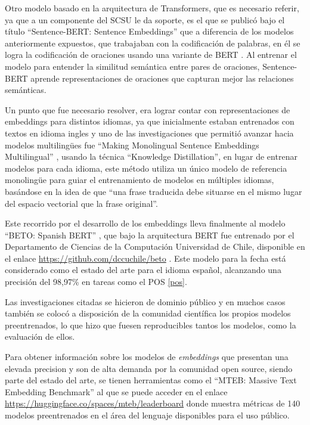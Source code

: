 \documentclass[
  12pt,
  openany]{book}
\begin{document}
Otro modelo basado en la arquitectura de Transformers, que es necesario referir, ya que a un componente del SCSU le da soporte, es el que se publicó bajo el título ``Sentence-BERT: Sentence Embeddings'' \citep{reimers2019a} que a diferencia de los modelos anteriormente expuestos, que trabajaban con la codificación de palabras, en él se logra la codificación de oraciones usando una variante de BERT \citep{devlin2018}. Al entrenar el modelo para entender la similitud semántica entre pares de oraciones, Sentence-BERT aprende representaciones de oraciones que capturan mejor las relaciones semánticas.

Un punto que fue necesario resolver, era lograr contar con representaciones de embeddings para distintos idiomas, ya que inicialmente estaban entrenados con textos en idioma ingles y uno de las investigaciones que permitió avanzar hacia modelos multilingües fue ``Making Monolingual Sentence Embeddings Multilingual'' \citep{reimers2020}, usando la técnica ``Knowledge Distillation'', en lugar de entrenar modelos para cada idioma, este método utiliza un único modelo de referencia monolingüe para guiar el entrenamiento de modelos en múltiples idiomas, basándose en la idea de que ``una frase traducida debe situarse en el mismo lugar del espacio vectorial que la frase original''.

Este recorrido por el desarrollo de los embeddings lleva finalmente al modelo ``BETO: Spanish BERT'' \citep{CaneteCFP2020}, que bajo la arquitectura BERT fue entrenado por el Departamento de Ciencias de la Computación Universidad de Chile, disponible en el enlace \url{https://github.com/dccuchile/beto} . Este modelo para la fecha está considerado como el estado del arte para el idioma español, alcanzando una precisión del 98,97\% en tareas como el POS \ref{pos}.

Las investigaciones citadas se hicieron de dominio público y en muchos casos también se colocó a disposición de la comunidad científica los propios modelos preentrenados, lo que hizo que fuesen reproducibles tantos los modelos, como la evaluación de ellos.

Para obtener información sobre los modelos de \emph{embeddings} que presentan una elevada precision y son de alta demanda por la comunidad open source, siendo parte del estado del arte, se tienen herramientas como el ``MTEB: Massive Text Embedding Benchmark'' \citep{muennighoff2022} al que se puede acceder en el enlace \url{https://huggingface.co/spaces/mteb/leaderboard} donde muestra métricas de 140 modelos preentrenados en el área del lenguaje disponibles para el uso público.
\end{document}
